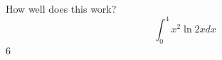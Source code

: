 \documentclass{article}
\begin{document}
How well does this work?
$$\int_0^4 x^2 \ln{2x}dx$$
6
\end{document}
